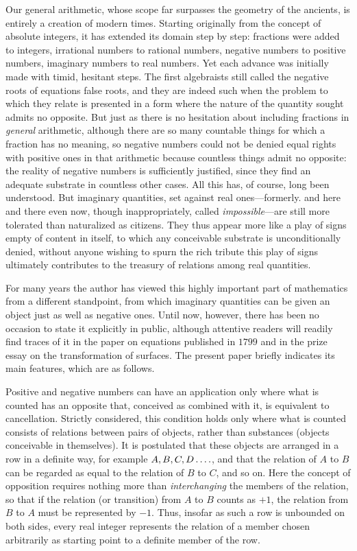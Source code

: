 Our general arithmetic, whose scope far surpasses the geometry of the ancients, is entirely a creation of modern times. Starting originally from the concept of absolute integers, it has extended its domain step by step: fractions were added to integers, irrational numbers to rational numbers, negative numbers to positive numbers, imaginary numbers to real numbers. Yet each advance was initially made with timid, hesitant steps. The first algebraists still called the negative roots of equations false roots, and they are indeed such when the problem to which they relate is presented in a form where the nature of the quantity sought admits no opposite. But just as there is no hesitation about including fractions in \emph{general} arithmetic, although there are so many countable things for which a fraction has no meaning, so negative numbers could not be denied equal rights with positive ones in that arithmetic because countless things admit no opposite: the reality of negative numbers is sufficiently justified, since they find an adequate substrate in countless other cases. All this has, of course, long been understood. But imaginary quantities, set against real ones---formerly. and here and there even now, though inappropriately, called \emph{impossible}---are still more tolerated than naturalized as citizens. They thus appear more like a play of signs empty of content in itself, to which any conceivable substrate is unconditionally denied, without anyone wishing to spurn the rich tribute this play of signs ultimately contributes to the treasury of relations among real quantities.

For many years the author has viewed this highly important part of mathematics from a different standpoint, from which imaginary quantities can be given an object just as well as negative ones. Until now, however, there has been no occasion to state it explicitly in public, although attentive readers will readily find traces of it in the paper on equations published in $1799$ and in the prize essay on the transformation of surfaces. The present paper briefly indicates its main features, which are as follows.

Positive and negative numbers can have an application only where
what is counted has an opposite that, conceived as combined with it, is equivalent to cancellation. Strictly considered, this condition holds only where what is counted consists of relations between pairs of objects, rather than substances (objects conceivable in themselves). It is postulated that these objects are arranged in a row in a definite way, for example $A,B,C,D\mathinner{.\,.\,.\,.}$, and that the relation of $A$ to $B$ can be regarded as equal to the relation of $B$ to $C$, and so on. Here the concept of opposition requires nothing more than \emph{interchanging} the members of the relation, so that if the relation (or transition) from $A$ to $B$ counts as $+1$, the relation from $B$ to $A$ must be represented by $-1$. Thus, insofar as such a row is unbounded on both sides, every real integer represents the relation of a member chosen arbitrarily as starting point to a definite member of the row.

